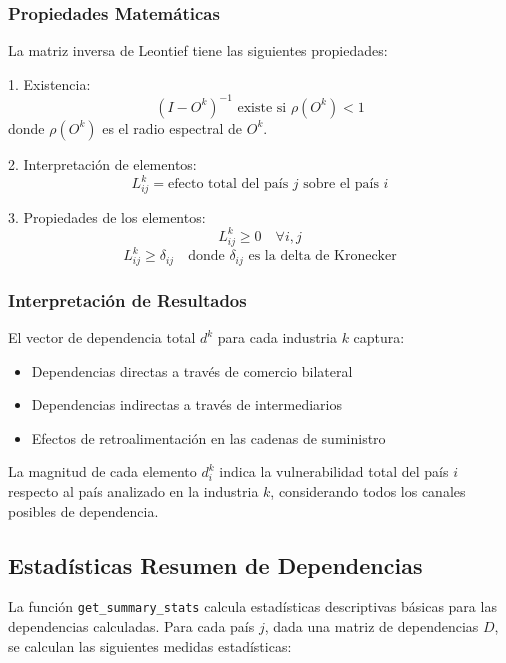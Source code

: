 \documentclass[11pt,a4paper]{article}
\begin{document}
\subsubsection{Propiedades Matemáticas}

La matriz inversa de Leontief tiene las siguientes propiedades:

1. Existencia:
\begin{equation}
(I - O^k)^{-1} \text{ existe si } \rho(O^k) < 1
\end{equation}
donde $\rho(O^k)$ es el radio espectral de $O^k$.

2. Interpretación de elementos:
\begin{equation}
L^k_{ij} = \text{efecto total del país } j \text{ sobre el país } i
\end{equation}

3. Propiedades de los elementos:
\begin{equation}
L^k_{ij} \geq 0 \quad \forall i,j
\end{equation}
\begin{equation}
L^k_{ij} \geq \delta_{ij} \quad \text{donde } \delta_{ij} \text{ es la delta de Kronecker}
\end{equation}

\subsubsection{Interpretación de Resultados}

El vector de dependencia total $d^k$ para cada industria $k$ captura:
\begin{itemize}
    \item Dependencias directas a través de comercio bilateral
    \item Dependencias indirectas a través de intermediarios
    \item Efectos de retroalimentación en las cadenas de suministro
\end{itemize}

La magnitud de cada elemento $d^k_i$ indica la vulnerabilidad total del país $i$ respecto al país analizado en la industria $k$, considerando todos los canales posibles de dependencia.

\subsection{Estadísticas Resumen de Dependencias}

La función \texttt{get\_summary\_stats} calcula estadísticas descriptivas básicas para las dependencias calculadas. Para cada país $j$, dada una matriz de dependencias $D$, se calculan las siguientes medidas estadísticas:
\end{document}

